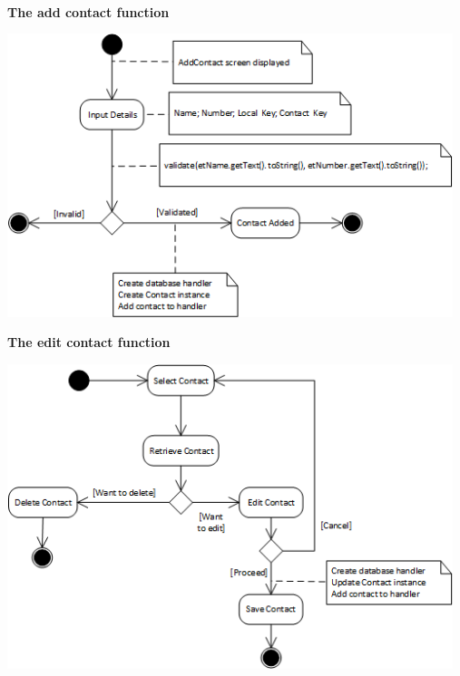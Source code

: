\textbf{\\}
\begin{center}
\textbf{The add contact function\\}
\end{center}
 \includegraphics[width=13cm]{diagrams/StateDiagrams/AddContactStateDiagram.png}
\textbf{\\}
\begin{center}
\textbf{The edit contact function\\}
\end{center}
 \includegraphics[width=13cm]{diagrams/StateDiagrams/EditContactStateDiagram.png}

\normalsize
\vspace{12pt}

